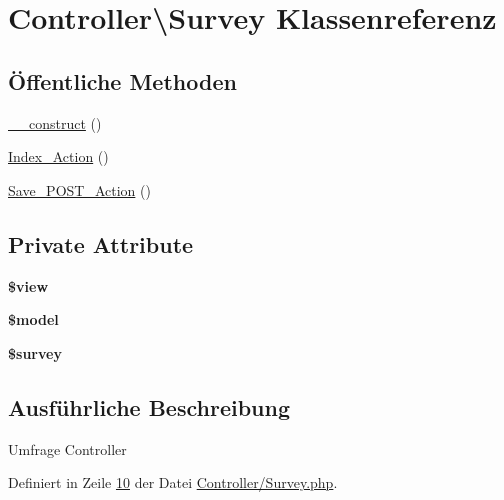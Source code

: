 \hypertarget{class_controller_1_1_survey}{\section{Controller\textbackslash{}Survey Klassenreferenz}
\label{class_controller_1_1_survey}
}
\subsection*{Öffentliche Methoden}
\begin{DoxyCompactItemize}
\item 
\hyperlink{class_controller_1_1_survey_a96fc5091aa3b11390854987ecf667f15}{\-\_\-\-\_\-construct} ()
\item 
\hyperlink{class_controller_1_1_survey_ab9a687bf4e1fe3c36b13ff873e94b212}{Index\-\_\-\-Action} ()
\item 
\hyperlink{class_controller_1_1_survey_a1a671d9a36a993bab69c12c16fcc60cc}{Save\-\_\-\-P\-O\-S\-T\-\_\-\-Action} ()
\end{DoxyCompactItemize}
\subsection*{Private Attribute}
\begin{DoxyCompactItemize}
\item 
\hypertarget{class_controller_1_1_survey_af4dfeefe4184d06ce16596852d1699fe}{{\bfseries \$view}}\label{class_controller_1_1_survey_af4dfeefe4184d06ce16596852d1699fe}

\item 
\hypertarget{class_controller_1_1_survey_aaf7d79f033911a2dccb8a9b86335f608}{{\bfseries \$model}}\label{class_controller_1_1_survey_aaf7d79f033911a2dccb8a9b86335f608}

\item 
\hypertarget{class_controller_1_1_survey_a5dbe38a79e94073188649d98023be07f}{{\bfseries \$survey}}\label{class_controller_1_1_survey_a5dbe38a79e94073188649d98023be07f}

\end{DoxyCompactItemize}


\subsection{Ausführliche Beschreibung}
Umfrage Controller 

Definiert in Zeile \hyperlink{_controller_2_survey_8php_source_l00010}{10} der Datei \hyperlink{_controller_2_survey_8php_source}{Controller/\-Survey.\-php}.




